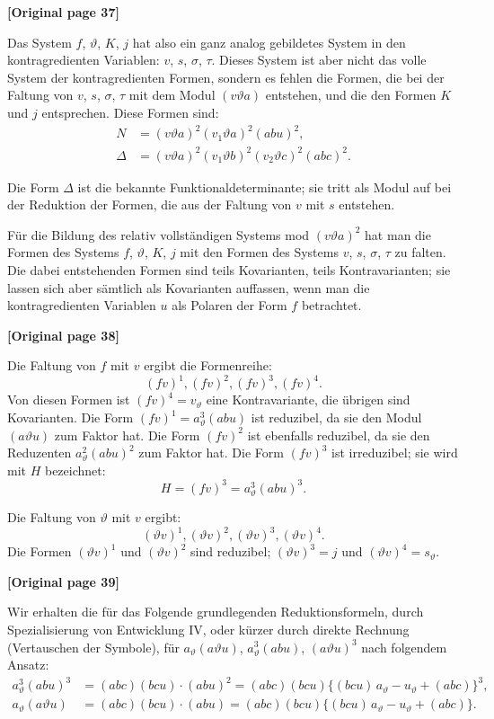 \documentclass[12pt,a4paper]{article}
\begin{document}
\noindent\textbf{[Original page 37]}

Das System $f$, $\vartheta$, $K$, $j$ hat also ein ganz analog gebildetes System in den kontragredienten Variablen: $v$, $s$, $\sigma$, $\tau$. Dieses System ist aber nicht das volle System der kontragredienten Formen, sondern es fehlen die Formen, die bei der Faltung von $v$, $s$, $\sigma$, $\tau$ mit dem Modul $(v \vartheta a)$ entstehen, und die den Formen $K$ und $j$ entsprechen. Diese Formen sind:
\begin{align*}
N &= (v \vartheta a)^2 (v_1 \vartheta a)^2 (abu)^2,\\
\varDelta &= (v \vartheta a)^2 (v_1 \vartheta b)^2 (v_2 \vartheta c)^2 (abc)^2.
\end{align*}

Die Form $\varDelta$ ist die bekannte Funktionaldeterminante; sie tritt als Modul auf bei der Reduktion der Formen, die aus der Faltung von $v$ mit $s$ entstehen.

Für die Bildung des relativ vollständigen Systems mod $(v \vartheta a)^2$ hat man die Formen des Systems $f$, $\vartheta$, $K$, $j$ mit den Formen des Systems $v$, $s$, $\sigma$, $\tau$ zu falten. Die dabei entstehenden Formen sind teils Kovarianten, teils Kontravarianten; sie lassen sich aber sämtlich als Kovarianten auffassen, wenn man die kontragredienten Variablen $u$ als Polaren der Form $f$ betrachtet.

\noindent\textbf{[Original page 38]}

Die Faltung von $f$ mit $v$ ergibt die Formenreihe:
\[(f v)^1, (f v)^2, (f v)^3, (f v)^4.\]
Von diesen Formen ist $(fv)^4 = v_\vartheta$ eine Kontravariante, die übrigen sind Kovarianten. Die Form $(fv)^1 = a_\vartheta^3 (abu)$ ist reduzibel, da sie den Modul $(a\vartheta u)$ zum Faktor hat. Die Form $(fv)^2$ ist ebenfalls reduzibel, da sie den Reduzenten $a_\vartheta^2 (abu)^2$ zum Faktor hat. Die Form $(fv)^3$ ist irreduzibel; sie wird mit $H$ bezeichnet:
\[H = (fv)^3 = a_\vartheta^3 (abu)^3.\]

Die Faltung von $\vartheta$ mit $v$ ergibt:
\[(\vartheta v)^1, (\vartheta v)^2, (\vartheta v)^3, (\vartheta v)^4.\]
Die Formen $(\vartheta v)^1$ und $(\vartheta v)^2$ sind reduzibel; $(\vartheta v)^3 = j$ und $(\vartheta v)^4 = s_\vartheta$.

\noindent\textbf{[Original page 39]}

Wir erhalten die für das Folgende grundlegenden Reduktionsformeln, durch Spezialisierung von Entwicklung IV, oder kürzer durch direkte Rechnung (Vertauschen der Symbole), für $a_\vartheta (a\vartheta u)$, $a_\vartheta^3 (abu)$, $(a\vartheta u)^3$ nach folgendem Ansatz:
\begin{align*}
a_\vartheta^3 (abu)^3 &= (abc)(bcu) \cdot (abu)^2 = (abc)(bcu)\{(bcu) \, a_\vartheta - u_\vartheta + (abc)\}^3,\\
a_\vartheta (a\vartheta u) &= (abc)(bcu) \cdot (abu) = (abc)(bcu)\{(bcu) \, a_\vartheta - u_\vartheta + (abc)\}.
\end{align*}
\end{document}
